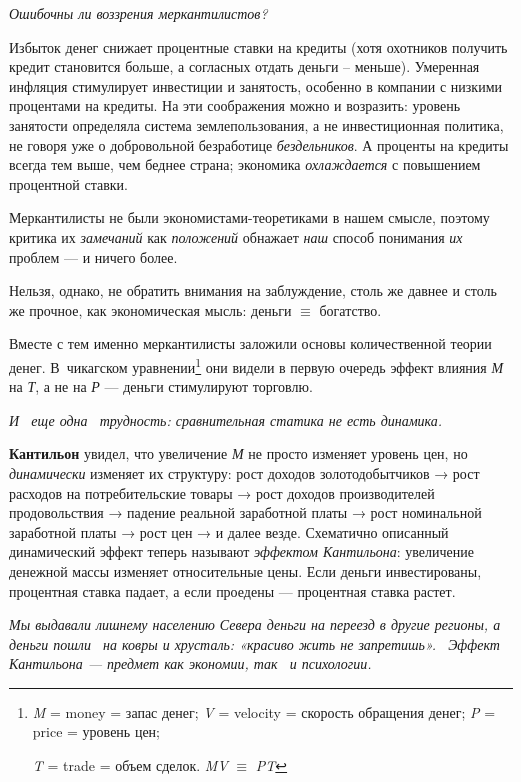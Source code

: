 {\itshape
Ошибочны ли воззрения меркантилистов?}

Избыток денег снижает процентные ставки на кредиты (хотя охотников получить кредит становится больше, а согласных отдать
деньги – меньше). Умеренная инфляция стимулирует инвестиции и занятость, особенно в компании с низкими процентами на
кредиты. На эти соображения можно и возразить: уровень занятости определяла система землепользования, а не
инвестиционная политика, не говоря уже о добровольной безработице \textit{бездельников}. А проценты на кредиты всегда
тем выше, чем беднее страна; экономика \textit{охлаждается} с повышением процентной ставки.

Меркантилисты не были экономистами-теоретиками в нашем смысле, поэтому критика их \textit{замечаний} как
\textit{положений} обнажает \textit{наш }способ понимания \textit{их} проблем — и ничего более.

Нельзя, однако, не обратить внимания на заблуждение, столь же давнее и столь же прочное, как экономическая мысль: деньги
${\equiv}$ богатство.

Вместе с тем именно меркантилисты заложили основы количественной теории денег. В~чикагском
уравнении\footnote{\textit{M} = money = запас денег; \textit{V} = velocity =
скорость обращения денег; \textit{P} = price = уровень цен; \par 
\textit{T} = trade = объем сделок. \textit{MV} ${\equiv}$ \textit{PT}} они видели в первую очередь эффект влияния \textit{М} на \textit{Т}, а не на \textit{Р }— деньги стимулируют торговлю.

{\itshape
И \ еще одна \ трудность: сравнительная статика не есть динамика.}

\textbf{Кантильон }увидел, что увеличение \textit{М} не просто изменяет уровень цен, но \textit{динамически} изменяет их
структуру: рост доходов золотодобытчиков → рост расходов на потребительские товары → рост доходов производителей
продовольствия → падение реальной заработной платы → рост номинальной заработной платы → рост цен → и далее везде.
Схематично описанный динамический эффект теперь называют \textit{эффектом Кантильона}: увеличение денежной массы
изменяет относительные цены. Если деньги инвестированы, процентная ставка падает, а если проедены — процентная ставка
растет.

\textit{Мы выдавали лишнему населению Севера деньги на переезд в другие регионы, а деньги пошли \ на ковры и хрусталь:
«красиво жить не запретишь». \ Эффект Кантильона — предмет как экономии, так \ и психологии.}

